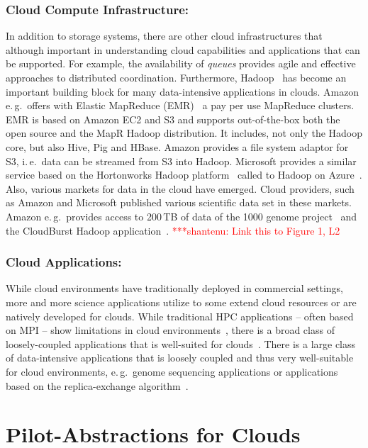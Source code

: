 \documentclass[times]{cpeauth}
\newcommand{\jhanote}[1]{ {\textcolor{red} { ***shantenu: #1 }}}
\newcommand{\jhanote}[1]{}
\begin{document}
\subsubsection*{Cloud Compute Infrastructure:} In addition to storage systems,
there are other cloud infrastructures that although important in
understanding cloud capabilities and applications that can be
supported. For example, the availability of {\it queues} provides
agile and effective approaches to distributed coordination.
Furthermore, Hadoop~\cite{hadoop} has become an important building
block for many data-intensive applications in clouds. Amazon
e.\,g.\ offers with Elastic MapReduce (EMR)~\cite{amazonemr} a pay per
use MapReduce clusters. EMR is based on Amazon EC2 and S3 and supports
out-of-the-box both the open source and the MapR Hadoop
distribution. It includes, not only the Hadoop core, but also Hive,
Pig and HBase. Amazon provides a file system adaptor for S3,
i.\,e.\ data can be streamed from S3 into Hadoop. Microsoft provides a
similar service based on the Hortonworks Hadoop
platform~\cite{hortonworks} called to Hadoop on
Azure~\cite{hadooponazure}. Also, various markets for data in the
cloud have emerged. Cloud providers, such as Amazon and Microsoft
published various scientific data set in these markets. Amazon
e.\,g.\ provides access to 200\,TB of data of the 1000 genome
project~\cite{amazon-1000genomes} and the CloudBurst Hadoop
application~\cite{schatz2009}. \jhanote{Link this to Figure 1, L2}


\subsubsection*{Cloud Applications:}
While cloud environments have traditionally deployed in commercial
settings, more and more science applications utilize to some extend
cloud resources or are natively developed for clouds. While
traditional HPC applications -- often based on MPI -- show limitations
in cloud
environments~\cite{Evangelinos2008,Mehrotra:2012:PEA:2287036.2287045},
there is a broad class of loosely-coupled applications that is
well-suited for clouds~\cite{1851544,Sehgal2011590}. There is a large
class of data-intensive applications that is loosely coupled and thus
very well-suitable for cloud environments, e.\,g.\ genome sequencing
applications or applications based on the replica-exchange
algorithm~\cite{bigjob_cloudcom10}.



\section{Pilot-Abstractions for Clouds}
\end{document}
